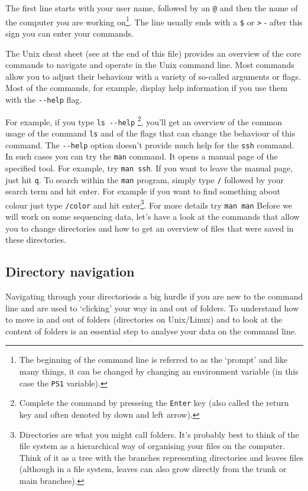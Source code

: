 \documentclass[11pt]{article}
\begin{document}
The first line starts with your user name, followed by an \texttt{@} and then
the name of the computer you are working on\footnote{The beginning of the command line is referred to as the `prompt' and
like many things, it can be changed by
changing an environment variable (in this case the \texttt{PS1} variable).
 }. The line usually ends with a
\texttt{\$} or \texttt{>} - after this sign you can enter your commands.

The Unix cheat sheet (see at the end of this file) provides an
overview of the core commands to navigate and operate in the Unix
command line. Most commands allow you to adjust their behaviour with a
variety of so-called arguments or flags. Most of the commands, for
example, display help information if you use them with the \texttt{-{}-help}
flag.

For example, if you type \texttt{ls -{}-help} \footnote{Complete the command by presseing the \texttt{Enter} key (also called the 
return key and often denoted by down and left arrow).
 }, you'll get an overview of the
common usage of the command \texttt{ls} and of the flags that can change the
behaviour of this command.  The \texttt{-{}-help} option doesn't provide much
help for the \texttt{ssh} command. In such cases you can try the \texttt{man}
command. It opens a manual page of the specified tool. For example,
try \texttt{man ssh}. If you want to leave the manual page, just hit \texttt{q}.
To search within the \texttt{man} program, simply type \texttt{/} followed by your search
term and hit enter. For example if you want to find something about colour
just type \texttt{/color} and hit enter\footnote{Directories are what you might call folders. It's probably best to
think of the file system as a hierarchical way of organising your files on the
computer. Think of it as a tree with the branches representing directories
and leaves files (although in a file system, leaves can also
grow directly from the trunk or main branches).
 }. For more details try \texttt{man man}
Before we will work on some sequencing data, let's have a look
at the commands that allow you to change directories and how to get an
overview of files that were saved in these directories.
\subsection{Directory navigation}
\label{sec-2-1}

Navigating through your directories\footnotemark[5] is a big hurdle if you are new to
the command line and are used to `clicking' your way in and out of folders. To
understand how to move in and out of folders (directories on Unix/Linux) and to look at the
content of folders is an essential step to analyse your data on
the command line.
\end{document}
